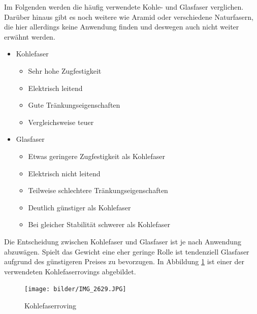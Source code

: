 \documentclass[paper=A4,pagesize,DIV=18, 12pt,listof=totoc,bibliography=totoc,headings=optiontohead,open=any]{article}
\begin{document}
Im Folgenden werden die häufig verwendete Kohle- und Glasfaser verglichen. Darüber hinaus gibt es noch weitere wie Aramid oder verschiedene Naturfasern, die hier allerdings keine Anwendung finden und deswegen auch nicht weiter erwähnt werden.

\begin{itemize}
	\item Kohlefaser
	\begin{itemize}
		\item Sehr hohe Zugfestigkeit
		\item Elektrisch leitend
		\item Gute Tränkungseigenschaften
		\item Vergleichsweise teuer
	\end{itemize}
	\item Glasfaser
	\begin{itemize}
		\item Etwas geringere Zugfestigkeit als Kohlefaser
		\item Elektrisch nicht leitend
		\item Teilweise schlechtere Tränkungseigenschaften
		\item Deutlich günstiger als Kohlefaser
		\item Bei gleicher Stabilität schwerer als Kohlefaser
	\end{itemize}
\end{itemize}

Die Entscheidung zwischen Kohlefaser und Glasfaser ist je nach Anwendung abzuwägen. Spielt das Gewicht eine eher geringe Rolle ist tendenziell Glasfaser aufgrund des günstigeren Preises zu bevorzugen. 
In Abbildung \ref{fig:roving} ist einer der verwendeten Kohlefaserrovings abgebildet. \cite{r_g_handbuch}
\begin{figure}[H]
	\centering
	\texttt{[image: bilder/IMG\_2629.JPG]}
	\caption{Kohlefaserroving} 
	\label{fig:roving}
\end{figure}

\end{document}
